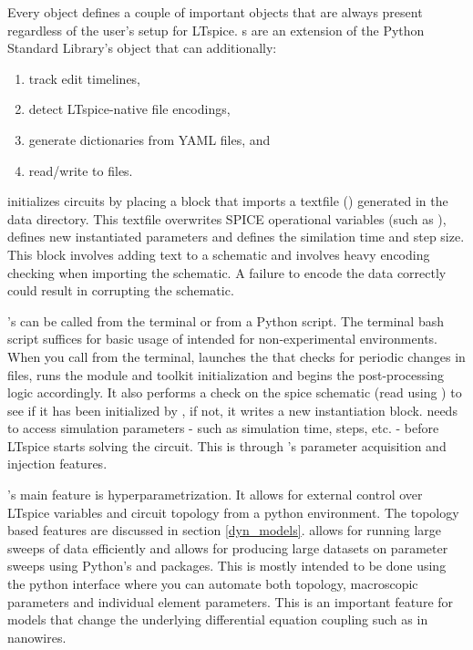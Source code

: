 Every  object defines a couple of important  objects that are always present regardless
of the user's setup for LTspice. s are an extension of the Python Standard Library's  object that can additionally:
\begin{enumerate}
    \item track edit timelines,
    \item detect LTspice-native file encodings,
    \item generate dictionaries from YAML files, and
    \item read/write to files.
\end{enumerate}

 initializes circuits by placing a block that imports a textfile () 
generated
in the  data directory. This textfile overwrites SPICE operational variables
(such as ), defines new  instantiated parameters and defines the
similation time and step size. This block involves adding text to a schematic and involves
heavy encoding checking when importing the schematic. A failure to encode the data correctly
could result in corrupting the schematic.

's  can be called from the terminal or from a Python script. The terminal
bash script suffices for basic usage of  intended for non-experimental environments.
When you call  from the terminal,  launches the  that checks for 
periodic changes in files, runs the module and toolkit initialization and begins the post-processing logic
accordingly. It also performs a check on the spice schematic (read using )
to see if it has been initialized
by , if not, it writes a new instantiation block.
 needs to access simulation parameters - such as simulation time, steps, etc. -
before LTspice starts solving the circuit. This is through 's parameter acquisition and injection 
features. 

's main feature is hyperparametrization. It allows for external control
over LTspice variables and circuit topology from a python environment. The topology
based features are discussed in section \ref{dyn_models}.  allows for 
running large sweeps of data efficiently and allows for producing large datasets
on parameter sweeps using Python's  and  packages. This is mostly
intended to be done using the python  interface where you can automate
both topology, macroscopic parameters and individual element parameters. This is 
an important feature for models that change the underlying differential equation 
coupling such as in nanowires.

